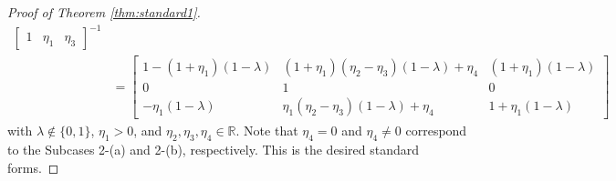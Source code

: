 \documentclass[11pt,a4paper,twosides]{amsart}
\theoremstyle{plain}
\theoremstyle{remark}
\numberwithin{equation}{section}
\newcommand{\R}{\mathbb{R}}
\def\le{\leqslant}
\DeclareMathOperator{\Span}{span}
\theoremstyle{definition}
\newcommand{\1}{{\bf 1}_{\{|x| < |t|\}}}
\begin{document}
\begin{proof}[Proof of Theorem \ref{thm:standard1}]
\begin{align*}
\begin{bmatrix}
	1 & \eta_1& \eta_3
	\end{bmatrix}^{-1}\\
	&=\begin{bmatrix}
	1 - (1+\eta_1)(1-\lambda) & 
	 (1+ \eta_1)(\eta_2 - \eta_3)(1-\lambda) + \eta_4
	& (1+\eta_1)(1-\lambda) \\
	0 & 1 & 0\\
	-\eta_1(1-\lambda) & \eta_1(\eta_2- \eta_3)(1-\lambda)+\eta_4 & 1+\eta_1(1-\lambda)
	\end{bmatrix}
\end{align*}
with $\lambda \not \in\{0,1\}$, 
$\eta_1>0$, and $\eta_2,\eta_3,\eta_4\in \R$.
Note that $\eta_4=0$ and $\eta_4\neq0$ correspond to the Subcases 2-(a) and 2-(b), respectively.
This is the desired standard forms.
%

\end{proof}
\end{document}
